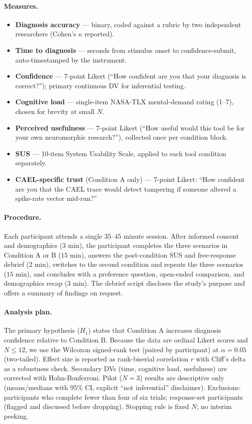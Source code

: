 \documentclass[10pt]{article}
\begin{document}
\paragraph{Measures.}
\begin{itemize}[leftmargin=*,topsep=2pt]
  \item \textbf{Diagnosis accuracy} — binary, coded against a rubric
    by two independent researchers (Cohen's $\kappa$ reported).
  \item \textbf{Time to diagnosis} — seconds from stimulus onset to
    confidence-submit, auto-timestamped by the instrument.
  \item \textbf{Confidence} — 7-point Likert (``How confident are you
    that your diagnosis is correct?''); primary continuous DV for
    inferential testing.
  \item \textbf{Cognitive load} — single-item NASA-TLX mental-demand
    rating (1--7), chosen for brevity at small $N$.
  \item \textbf{Perceived usefulness} — 7-point Likert (``How useful
    would this tool be for your own neuromorphic research?''),
    collected once per condition block.
  \item \textbf{SUS} — 10-item System Usability Scale, applied to
    each tool condition separately.
  \item \textbf{CAEL-specific trust} (Condition A only) — 7-point
    Likert: ``How confident are you that the CAEL trace would detect
    tampering if someone altered a spike-rate vector mid-run?''
\end{itemize}

\paragraph{Procedure.}
Each participant attends a single $35$--$45$ minute session.  After
informed consent and demographics ($3$ min), the participant completes
the three scenarios in Condition A or B ($15$ min), answers the
post-condition SUS and free-response debrief ($2$ min), switches to the
second condition and repeats the three scenarios ($15$ min), and
concludes with a preference question, open-ended comparison, and
demographics recap ($3$ min).  The debrief script discloses the study's
purpose and offers a summary of findings on request.

\paragraph{Analysis plan.}
The primary hypothesis ($H_1$) states that Condition A increases
diagnosis confidence relative to Condition B.  Because the data are
ordinal Likert scores and $N \leq 12$, we use the Wilcoxon
signed-rank test (paired by participant) at $\alpha = 0.05$
(two-tailed).  Effect size is reported as rank-biserial correlation
$r$ with Cliff's delta as a robustness check.  Secondary DVs (time,
cognitive load, usefulness) are corrected with Holm-Bonferroni.  Pilot
($N=3$) results are descriptive only (means/medians with 95\% CI,
explicit ``not inferential'' disclaimer).  Exclusions: participants who
complete fewer than four of six trials; response-set participants
(flagged and discussed before dropping).  Stopping rule is fixed $N$;
no interim peeking.
\end{document}
